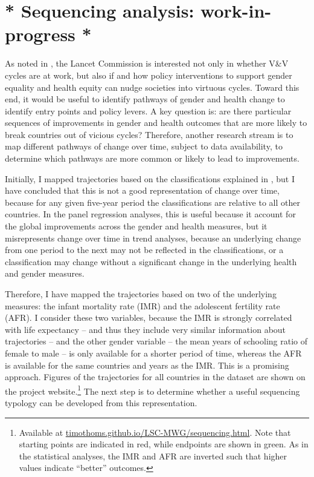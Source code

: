\documentclass[12pt]{article}
\begin{document}
\section{* Sequencing analysis: work-in-progress *}
\label{sequencing}

As noted in , the Lancet Commission is interested not only in whether V\&V cycles are at work, but also if and how policy interventions to support gender equality and health equity can nudge societies into virtuous cycles. Toward this end, it would be useful to identify pathways of gender and health change to identify entry points and policy levers. A key question is: are there particular sequences of improvements in gender and health outcomes that are more likely to break countries out of vicious cycles? Therefore, another research stream is to map different pathways of change over time, subject to data availability, to determine which pathways are more common or likely to lead to improvements.

Initially, I mapped trajectories based on the classifications explained in , but I have concluded that this is not a good representation of change over time, because for any given five-year period the classifications are relative to all other countries. In the panel regression analyses, this is useful because it account for the global  improvements across the gender and health measures, but it misrepresents change over time in trend analyses, because an underlying change from one period to the next may not be reflected in the classifications, or a classification may change without a significant change in the underlying health and gender measures.

Therefore, I have mapped the trajectories based on two of the underlying measures: the infant mortality rate (IMR) and the adolescent fertility rate (AFR). I consider these two variables, because the IMR is strongly correlated with life expectancy -- and thus they include very similar information about trajectories -- and the other gender variable -- the mean years of schooling ratio of female to male -- is only available for a shorter period of time, whereas the AFR is available for the same countries and years as the IMR. This is a promising approach.
Figures of the trajectories for all countries in the dataset are shown on the project website.\footnote{Available at \href{https://timothoms.github.io/LSC-MWG/sequencing.html}{timothoms.github.io/LSC-MWG/sequencing.html}. Note that starting points are indicated in red, while endpoints are shown in green. As in the statistical analyses, the IMR and AFR are inverted such that higher values indicate \enquote{better} outcomes.}
The next step is to determine whether a useful sequencing typology can be developed from this representation.
\end{document}
